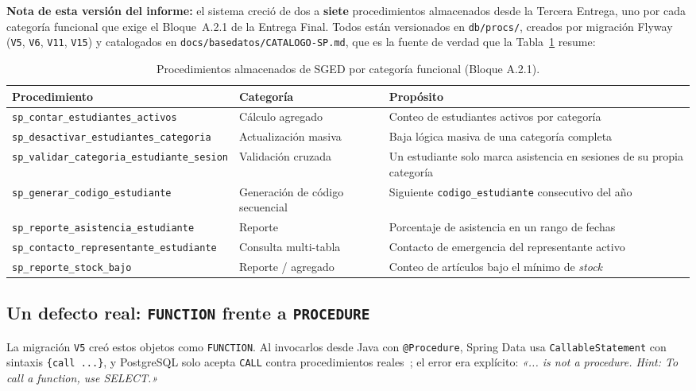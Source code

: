 \documentclass[11pt,a4paper]{article}
\newcommand{\ruta}[1]{\texttt{\footnotesize #1}}
\begin{document}
\textbf{Nota de esta versión del informe:} el sistema creció de dos a
\textbf{siete} procedimientos almacenados desde la Tercera Entrega, uno
por cada categoría funcional que exige el Bloque~A.2.1 de la Entrega
Final. Todos están versionados en \ruta{db/procs/}, creados por
migración Flyway~\cite{flyway} (\texttt{V5}, \texttt{V6}, \texttt{V11},
\texttt{V15}) y catalogados en \ruta{docs/basedatos/CATALOGO-SP.md}, que
es la fuente de verdad que la Tabla~\ref{tab:procs} resume:

\begin{table}[htbp]
\centering
\caption{Procedimientos almacenados de SGED por categoría funcional (Bloque A.2.1).}
\label{tab:procs}
\begin{tabular}{@{}p{4.6cm}p{3.1cm}p{6.2cm}@{}}
\toprule
\textbf{Procedimiento} & \textbf{Categoría} & \textbf{Propósito} \\
\midrule
\texttt{sp\_contar\_estudiantes\_activos} & Cálculo agregado & Conteo de estudiantes activos por categoría \\
\texttt{sp\_desactivar\_estudiantes\_categoria} & Actualización masiva & Baja lógica masiva de una categoría completa \\
\texttt{sp\_validar\_categoria\_estudiante\_sesion} & Validación cruzada & Un estudiante solo marca asistencia en sesiones de su propia categoría \\
\texttt{sp\_generar\_codigo\_estudiante} & Generación de código secuencial & Siguiente \texttt{codigo\_estudiante} consecutivo del año \\
\texttt{sp\_reporte\_asistencia\_estudiante} & Reporte & Porcentaje de asistencia en un rango de fechas \\
\texttt{sp\_contacto\_representante\_estudiante} & Consulta multi-tabla & Contacto de emergencia del representante activo \\
\texttt{sp\_reporte\_stock\_bajo} & Reporte / agregado & Conteo de artículos bajo el mínimo de \emph{stock} \\
\bottomrule
\end{tabular}
\end{table}

\subsection{Un defecto real: \texttt{FUNCTION} frente a \texttt{PROCEDURE}}

La migración \texttt{V5} creó estos objetos como \texttt{FUNCTION}. Al
invocarlos desde Java con \texttt{@Procedure}, Spring Data usa
\texttt{CallableStatement} con sintaxis \texttt{\{call ...\}}, y PostgreSQL
solo acepta \texttt{CALL} contra procedimientos reales~\cite{postgresql16};
el error era explícito: \emph{«... is not a procedure. Hint: To call a
function, use SELECT.»}
\end{document}
